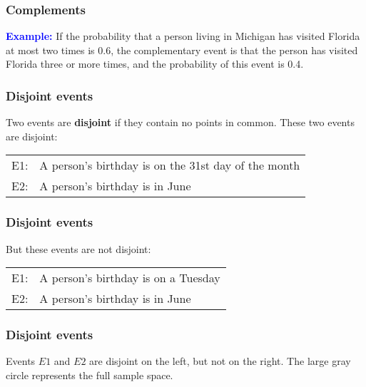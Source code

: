 \begin{frame}
\frametitle{Complements}
\textcolor{blue}{\bf Example:} If the probability that a person
living in Michigan has visited Florida at most two times is 0.6, the
complementary event is that the person has visited Florida three or
more times, and the probability of this event is 0.4.

\end{frame}

\begin{frame}
\frametitle{Disjoint events}

Two events are {\bf disjoint} if they contain no points in common.
These two events are disjoint:

\begin{center}
\begin{tabular}{ll}
E1:& A person's birthday is on the 31st day of the month\\
E2:& A person's birthday is in June
\end{tabular}
\end{center}

\end{frame}

\begin{frame}
\frametitle{Disjoint events}

But these events are not disjoint:

\begin{center}
\begin{tabular}{ll}
E1:& A person's birthday is on a Tuesday\\
E2:& A person's birthday is in June
\end{tabular}
\end{center}

\end{frame}

\begin{frame}
\frametitle{Disjoint events}

Events $E1$ and $E2$ are disjoint on the left, but not on the
right. The large gray circle represents the full sample space.


\end{frame}


